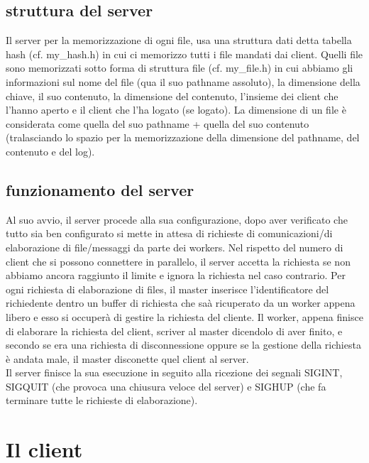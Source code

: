 \documentclass[a4paper, 10pt]{report}
\begin{document}
	\subsection{struttura del server}
	
	Il server per la memorizzazione di ogni file, usa una struttura dati detta tabella hash (cf. my\_hash.h) in cui ci memorizzo tutti i file mandati dai client. Quelli file sono memorizzati sotto forma di struttura file (cf. my\_file.h) in cui abbiamo gli informazioni sul nome del file (qua il suo pathname assoluto), la dimensione della chiave, il suo contenuto, la dimensione del contenuto, l'insieme dei client che l'hanno aperto e il client che l'ha logato (se logato). La dimensione di un file è considerata come quella del suo pathname + quella del suo contenuto (tralasciando lo spazio per la memorizzazione della dimensione del pathname, del contenuto e del log).
	
	\subsection{funzionamento del server}
	
	Al suo avvio, il server procede alla sua configurazione, dopo aver verificato che tutto sia ben configurato si mette in attesa di richieste di comunicazioni/di elaborazione di file/messaggi da parte dei workers. Nel rispetto del numero di client che si possono connettere in parallelo, il server accetta la richiesta se non abbiamo ancora raggiunto il limite e ignora la richiesta nel caso contrario. Per ogni richiesta di elaborazione di files, il master inserisce l'identificatore del richiedente dentro un buffer di richiesta che saà ricuperato da un worker appena libero e esso si occuperà di gestire la richiesta del cliente. Il worker, appena finisce di elaborare la richiesta del client, scriver al master dicendolo di aver finito, e secondo se era una richiesta di disconnessione oppure se la gestione della richiesta è andata male, il master disconette quel client al server. \\
	
	Il server finisce la sua esecuzione in seguito alla ricezione dei segnali SIGINT, SIGQUIT (che provoca una chiusura veloce del server) e SIGHUP (che fa terminare tutte le richieste di elaborazione).
	
	\section{Il client}
	
\end{document}
